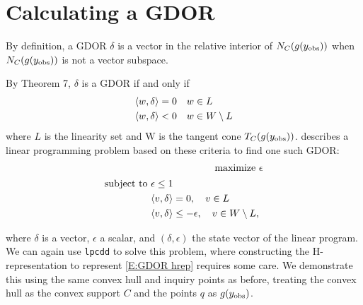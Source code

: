 \section{Calculating a GDOR} \label{S:GDOR calc}
By definition, a GDOR $\delta$ is a vector in the relative interior of $N_C(g(y_{\text{obs}}))$ when
$N_C(g(y_{\text{obs}}))$ is not a vector subspace.  

By Theorem 7, $\delta$ is a GDOR if and only if
\begin{align*}
	\langle w,\delta \rangle & = 0 	\quad w \in L\\
	\langle w,\delta \rangle & < 0 	\quad w \in W \setminus L
\end{align*}
where $L$ is the linearity set and W is the tangent cone $T_C(g(y_{\text{obs}}))$.
\citet{Geyer:gdor} describes a linear programming problem based on these
criteria to find one such GDOR:
\begin{align}
	\text{maximize } 	&\epsilon \label{E:GDOR objv} \\ 
	\begin{split}
	\text{subject to } 	&\epsilon \leq 1 \label{E:GDOR hrep}\\
	&\langle v,\delta \rangle = 0, \quad v \in L \\
	&\langle v,\delta \rangle \leq -\epsilon, \quad v \in W \setminus L,
	\end{split}
\end{align}

where $\delta$ is a vector, $\epsilon$ a scalar, and $(\delta, \epsilon)$ the state
vector of the linear program.  We can again use \texttt{lpcdd} to solve this 
problem, where constructing the H-representation to represent \eqref{E:GDOR hrep}
requires some care.  We demonstrate this using the same convex hull and inquiry points as 
before, treating the convex hull as the convex support $C$ and 
the points $q$ as $g(y_{\text{obs}})$.
